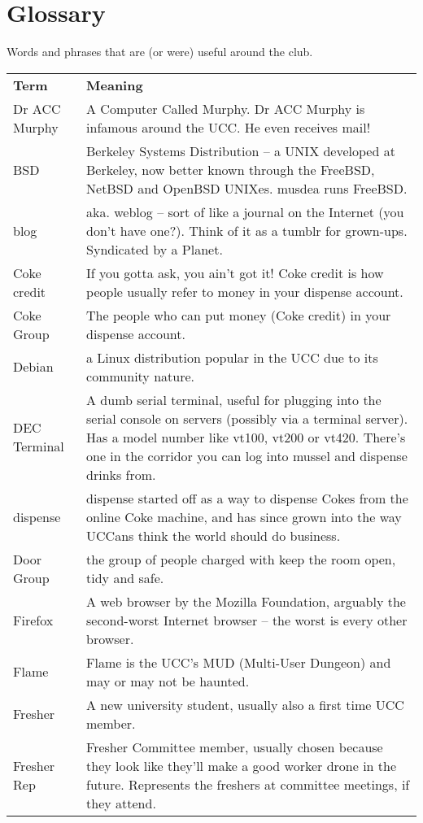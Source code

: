 \chapter*{Glossary}

Words and phrases that are (or were) useful around the club.

\begin{tabular}{ll}
	{\bf Term} & {\bf Meaning} \\
Dr ACC Murphy &
A Computer Called Murphy. Dr ACC Murphy is infamous around the UCC. He even receives mail! \\
BSD &
Berkeley Systems Distribution – a UNIX developed at Berkeley, now better known through the FreeBSD, NetBSD and OpenBSD UNIXes. musdea runs FreeBSD. \\
blog &
aka. weblog – sort of like a journal on the Internet (you don't have one?). Think of it as  a tumblr for grown-ups. Syndicated by a Planet. \\
Coke credit & 
If you gotta ask, you ain't got it! Coke credit is how people usually refer to money in your dispense account. \\
Coke Group &
The people who can put money (Coke credit) in your dispense account. \\
Debian &
a Linux distribution popular in the UCC due to its community nature. \\
DEC Terminal &
A dumb serial terminal, useful for plugging into the serial console on servers (possibly via a terminal server). Has a model number like vt100, vt200 or vt420. There's one in the corridor you can log into mussel and dispense drinks from. \\
dispense &
dispense started off as a way to dispense Cokes from the online Coke machine, and has since grown into the way UCCans think the world should do business. \\
Door Group &
the group of people charged with keep the room open, tidy and safe. \\
Firefox &
A web browser by the Mozilla Foundation, arguably the second-worst Internet browser – the worst is every other browser. \\
Flame &
Flame is the UCC's MUD (Multi-User Dungeon) and may or may not be haunted. \\
Fresher &
A new university student, usually also a first time UCC member. \\
Fresher Rep &
Fresher Committee member, usually chosen because they look like they'll make a good worker drone in the future. Represents the freshers at committee meetings, if they attend. \\

\end{tabular}
